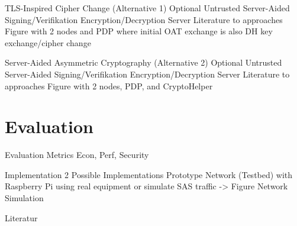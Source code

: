 \documentclass[en]{sdqbeamer}
\begin{document}
\begin{frame}{TLS-Inspired Cipher Change (Alternative 1)}
    Optional Untrusted Server-Aided Signing/Verifikation Encryption/Decryption Server
    Literature to approaches
    Figure with 2 nodes and PDP where initial OAT exchange is also DH key exchange/cipher change
\end{frame}

\begin{frame}{Server-Aided Asymmetric Cryptography (Alternative 2)}
    Optional Untrusted Server-Aided Signing/Verifikation Encryption/Decryption Server
    Literature to approaches
    Figure with 2 nodes, PDP, and CryptoHelper
\end{frame}

\section{Evaluation}
\begin{frame}{Evaluation Metrics}
    Econ, Perf, Security
\end{frame}

\begin{frame}{Implementation}
    2 Possible Implementations
    Prototype Network (Testbed) with Raspberry Pi using real equipment or simulate SAS traffic -> Figure
    Network Simulation
\end{frame}

\appendix
\beginbackup

\begin{frame}{Literatur}
\printbibliography
\end{frame}

\backupend
\end{document}
